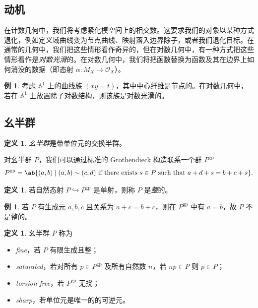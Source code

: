 \documentclass{amsart}
\theoremstyle{definition}
\newtheorem{defn}[thm]{定义}
\newtheorem{exm}[thm]{例}
\theoremstyle{remark}
\theoremstyle{plain}
\theoremstyle{definition}
\theoremstyle{remark}
\newcommand{\A}{\mathbb{A}}
\newcommand{\mc}[1]{\mathcal{#1}}
\newcommand{\mr}[1]{\mathrm{#1}}
\newcommand{\on}[1]{\operatorname{#1}}
\newcommand{\1}{\mathbf{1}}
\newcommand{\2}{\mathbf{2}}
\newcommand{\3}{\mathbf{3}}
\begin{document}
\subsection{动机}%
\label{sub:Motivation}

在计数几何中，我们将考虑紧化模空间上的相交数。这要求我们的对象以某种方式退化，例如定义域曲线变为节点曲线、映射落入边界除子，或者我们退化目标。在通常的几何中，我们把这些情形看作奇异的，但在对数几何中，有一种方式把这些情形看作是\textit{对数光滑}的。在对数几何中，我们将把函数替换为函数及其在边界上如何消没的数据（即态射 \(\alpha \colon M_X \to \mc{O}_X\)）。

\begin{exm}
    考虑 \(\A^1\) 上的曲线族 \((xy=t)\)，其中中心纤维是节点的。在对数几何中，若在 \(\A^1\) 上放置除子对数结构，则该族是对数光滑的。
\end{exm}

\subsection{幺半群}%
\label{sub:Monoids}

\begin{defn}
    \textit{幺半群}是带单位元的交换半群。
\end{defn}

对幺半群 \(P\)，我们可以通过标准的 Grothendieck 构造联系一个群 \(P^{\mr{gp}}\)
\[ P^{\mr{gp}} = \ab\{(a,b) \mid (a,b) \sim (c,d) \text{ if there exists } s \in P \text{ such that } a+d+s = b+c+s \}. \]
\begin{defn}
若自然态射 \(P \hookrightarrow P^{\mr{gp}}\) 是单射，则称 \(P\) 是\textit{整}的。
\end{defn}

\begin{exm}
    若 \(P\) 有生成元 \(a,b,c\) 且关系为 \(a+c=b+c\)，则在 \(P^{\on{gp}}\) 中有 \(a = b\)，故 \(P\) 不是整的。
\end{exm}

\begin{defn}
    幺半群 \(P\) 称为
    \begin{itemize}
        \item \textit{fine}，若 \(P\) 有限生成且整；
        \item \textit{saturated}，若对所有 \(p \in P^{\mr{gp}}\) 及所有自然数 \(n\)，若 \(np \in P\) 则 \(p \in P\)；
        \item \textit{torsion-free}，若 \(P^{\mr{gp}}\) 无挠；
        \item \textit{sharp}，若单位元是唯一的的可逆元。
    \end{itemize}
\end{defn}
\end{document}
